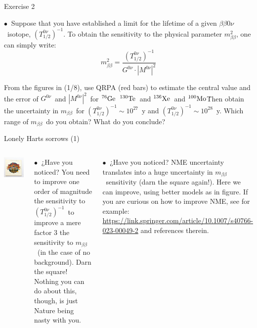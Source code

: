 \documentclass [aspectratio=169]{beamer}
\newcommand{\bbonu}{\ensuremath{\beta\beta0\nu}}
\newcommand{\mbb}{\ensuremath{m_{\beta\beta}}}
\newcommand{\mbbsq}{\ensuremath{m_{\beta\beta}^2}}
\newcommand{\tonu}{\ensuremath{(T_{1/2}^{0\nu})^{-1}}}
\newcommand{\gonu}{\ensuremath{G^{0\nu}}}
\newcommand{\monu}{\ensuremath{|M^{0\nu}|^2}}
\newcommand{\XE}{\ensuremath{{}^{136}{\rm Xe}}}
\newcommand{\GE}{\ensuremath{{}^{76}{\rm Ge}}}
\newcommand{\TE}{\ensuremath{{}^{130}{\rm Te}}}
\newcommand{\MO}{\ensuremath{{}^{100}{\rm Mo}}}
\begin{document}

\begin{frame}{Exercise 2}

$\bullet~$ Suppose that you have established a limit for the lifetime of a given \bbonu\ isotope, 
\tonu. To obtain the sensitivity to the physical parameter \mbbsq, one can simply write:
\[
\mbbsq = \frac{\tonu}{\gonu\cdot\monu}
\]

From the figures in (1/8), use QRPA (red bars) to estimate the central value and the error of \gonu\ and \monu\ for \GE\, \TE\ and \XE\ and \MO\. Then obtain the uncertainty in \mbb\ for 
$\tonu \sim 10^{27}$~y and $\tonu \sim 10^{28}$~y. Which range of \mbb\ do you obtain? What do you conclude?

\end{frame}


\begin{frame}{Lonely Harts sorrows (1)}
\begin{columns}
\includegraphics[scale=0.35]{lonelyhearts.png}

$\bullet~$ ¿Have you noticed? You need to improve one order of magnitude the sensitivity to \tonu\ to improve a mere factor 3 the sensitivity to \mbb\ (in the case of no background). Darn the square! Nothing you can do about this, though, is just Nature being nasty with you. 

$\bullet~$ ¿Have you noticed? NME uncertainty translates into a huge uncertainty in \mbb\ sensitivity (darn the square again!). Here we can improve, using better models as in figure. If you are curious on how to improve NME, see for example: \url{https://link.springer.com/article/10.1007/s40766-023-00049-2} and references therein.  

\end{columns}
\end{frame}
\end{document}
